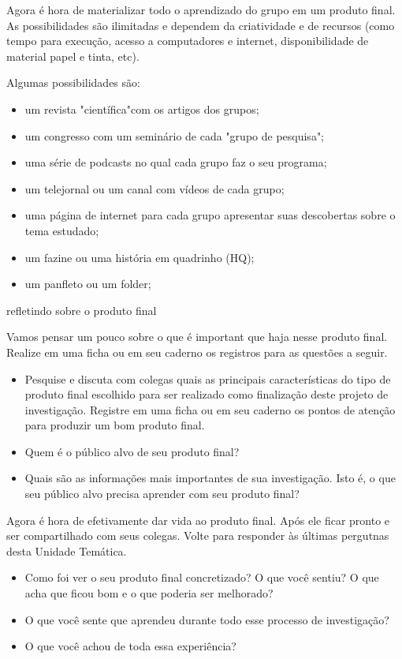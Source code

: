 \label{etapa5}

Agora é hora de materializar todo o aprendizado do grupo em um produto final. As possibilidades são ilimitadas e dependem da criatividade e de recursos (como tempo para execução, acesso a computadores e internet, disponibilidade de material papel e tinta, etc). 

Algumas possibilidades são:

\begin{itemize}
\item um revista "científica"{}com os artigos dos grupos;
\item um congresso com um seminário de cada "grupo de pesquisa";
\item uma série de podcasts no qual cada grupo faz o seu programa;
\item um telejornal ou um canal com vídeos de cada grupo;
\item uma página de internet para cada grupo apresentar suas descobertas sobre o tema estudado;
\item um fazine ou uma história em quadrinho (HQ);
\item um panfleto ou um folder;
\end{itemize}

\begin{task}{refletindo sobre o produto final}

Vamos pensar um pouco sobre o que é important que haja nesse produto final. Realize em uma ficha ou em seu caderno os registros para as questões a seguir.

\begin{itemize}
\item Pesquise e discuta com colegas quais as principais características do tipo de produto final escolhido para ser realizado como finalização deste projeto de investigação. Registre em uma ficha ou em seu caderno os pontos de atenção para produzir um bom produto final.
\item Quem é o público alvo de seu produto final?
\item Quais são as informações mais importantes de sua investigação. Isto é, o que seu público alvo precisa aprender com seu produto final?
\end{itemize}

Agora é hora de efetivamente dar vida ao produto final. Após ele ficar pronto e ser compartilhado com seus colegas. Volte para responder às últimas pergutnas desta Unidade Temática.

\begin{itemize}
\item Como foi ver o seu produto final concretizado? O que você sentiu? O que acha que ficou bom e o que poderia ser melhorado?
\item O que você sente que aprendeu durante todo esse processo de investigação?
\item O que você achou de toda essa experiência?
\end{itemize}
\end{task}


